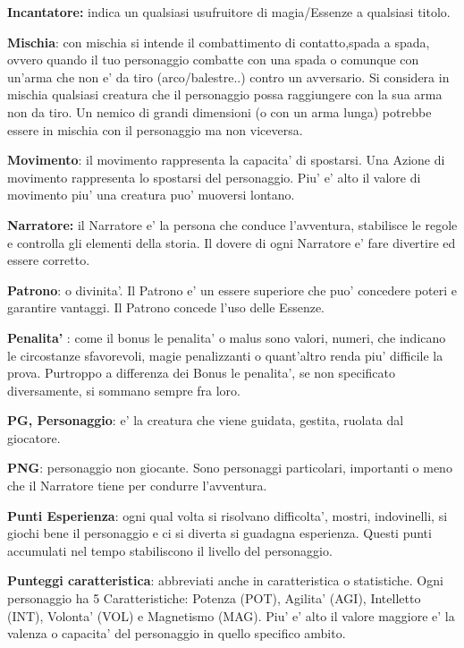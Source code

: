 \documentclass[a4paper,11pt,twoside,openany]{dndbook}
\begin{document}
\textbf{Incantatore:} indica un qualsiasi usufruitore di magia/Essenze a qualsiasi titolo.

\textbf{Mischia}: con mischia si intende il combattimento di contatto,spada a spada, ovvero quando il tuo personaggio combatte con una spada o comunque con un'arma che non e' da tiro (arco/balestre..) contro un avversario.
Si considera in mischia qualsiasi creatura che il personaggio possa raggiungere con la sua arma non da tiro. Un nemico di grandi dimensioni (o con un arma lunga) potrebbe essere in mischia con il personaggio ma non viceversa.

\textbf{Movimento}: il movimento rappresenta la capacita' di spostarsi. Una Azione di movimento rappresenta lo spostarsi del personaggio. Piu' e' alto il valore di movimento piu' una creatura puo' muoversi lontano.

\textbf{Narratore:} il Narratore e' la persona che conduce l'avventura, stabilisce le regole e controlla gli elementi della storia. Il dovere di ogni Narratore e' fare divertire ed essere corretto.

\textbf{Patrono}: o divinita'. Il Patrono e' un essere superiore che puo' concedere poteri e garantire vantaggi. Il Patrono concede l'uso delle Essenze.

\textbf{Penalita'} : come il bonus le penalita' o malus sono valori, numeri, che indicano le circostanze sfavorevoli, magie penalizzanti o quant'altro renda piu' difficile la prova. Purtroppo a differenza dei Bonus le penalita', se non specificato diversamente, si sommano sempre fra loro. 

\textbf{PG, Personaggio}: e' la creatura che viene guidata, gestita, ruolata dal giocatore.

\textbf{PNG}: personaggio non giocante. Sono personaggi particolari, importanti o meno che il Narratore tiene per condurre l'avventura.

\textbf{Punti Esperienza}:   ogni qual volta si risolvano difficolta', mostri, indovinelli, si giochi bene il personaggio e ci si diverta si guadagna esperienza. Questi punti accumulati nel tempo stabiliscono il livello del personaggio.

\textbf{Punteggi caratteristica}: abbreviati anche in caratteristica o statistiche. Ogni personaggio ha 5 Caratteristiche: Potenza (POT), Agilita' (AGI), Intelletto (INT), Volonta' (VOL) e Magnetismo (MAG). Piu' e' alto il valore maggiore e' la valenza o capacita' del personaggio in quello specifico ambito.
\end{document}
